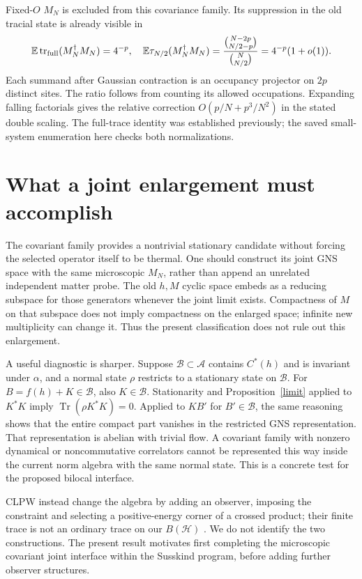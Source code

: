 \documentclass[11pt]{article}
\newcommand{\HH}{\mathcal H}
\newcommand{\Alg}{\mathcal A}
\newcommand{\Tr}{\operatorname{Tr}}
\begin{document}
Fixed-$O$ $M_N$ is excluded from this covariance family. Its
suppression in the old tracial state is already visible in
\begin{equation}
 \mathbb E\operatorname{tr}_{\rm full}(M_N^\dagger M_N)=4^{-p},
 \quad
 \mathbb E\tau_{N/2}(M_N^\dagger M_N)
 =\frac{\binom{N-2p}{N/2-p}}{\binom N{N/2}}
 =4^{-p}(1+o(1)).
\end{equation}
Each summand after Gaussian contraction is an occupancy projector
on $2p$ distinct sites. The ratio follows from counting its
allowed occupations. Expanding falling factorials gives the
relative correction $O(p/N+p^3/N^2)$ in the stated double scaling.
The full-trace identity was established previously; the saved
small-system enumeration here checks both normalizations.

\newpage
\section{What a joint enlargement must accomplish}
The covariant family provides a nontrivial stationary candidate
without forcing the selected operator itself to be thermal.
One should construct its joint GNS space with the same microscopic
$M_N$, rather than append an unrelated independent matter probe.
The old $h,M$ cyclic space embeds as a reducing subspace for those
generators whenever the joint limit exists. Compactness of $M$
on that subspace does not imply compactness on the enlarged space;
infinite new multiplicity can change it. Thus the present
classification does not rule out this enlargement.

A useful diagnostic is sharper. Suppose $\mathcal B\subset\Alg$
contains $C^*(h)$ and is invariant under $\alpha$, and a normal
state $\rho$ restricts to a stationary state on $\mathcal B$.
For $B=f(h)+K\in\mathcal B$, also $K\in\mathcal B$.
Stationarity and Proposition~\ref{limit} applied to $K^*K$ imply
$\Tr(\rho K^*K)=0$. Applied to $KB'$ for $B'\in\mathcal B$,
the same reasoning shows that the entire compact part vanishes
in the restricted GNS representation. That representation is
abelian with trivial flow. A covariant family with nonzero
dynamical or noncommutative correlators cannot be represented
this way inside the current norm algebra with the same normal state.
This is a concrete test for the proposed bilocal interface.

CLPW instead change the algebra by adding an observer, imposing
the constraint and selecting a positive-energy corner of a crossed
product; their finite trace is not an ordinary trace on our
$B(\HH)$ \cite[Sec.~2.4]{CLPW}. We do not identify the two
constructions. The present result motivates first completing
the microscopic covariant joint interface within the Susskind
program, before adding further observer structures.
\end{document}
